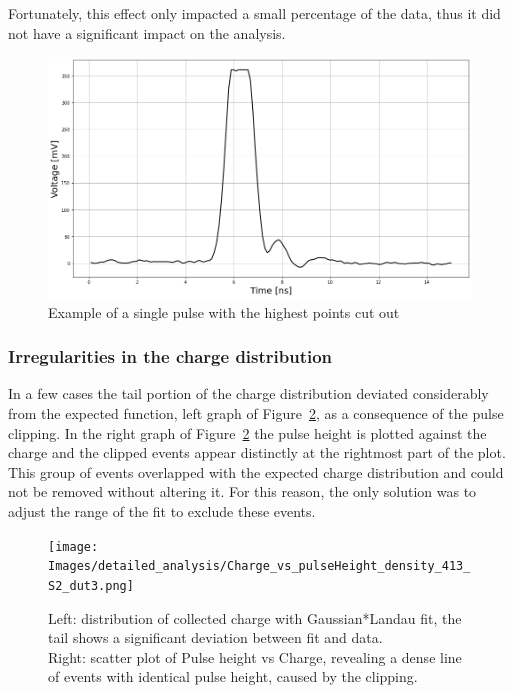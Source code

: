 Fortunately, this effect only impacted a small percentage of the data, thus it did not have a significant impact on the analysis.

\begin{figure}[h!tbp]
    \centering
    \includegraphics[width=.9\linewidth]{Images/detailed_analysis/Waveform of clipped pulse (ns).png}
    \captionsetup{width=\captionwidth}
    \caption{Example of a single pulse with the highest points cut out}
    \label{fig:clipped_pulse}
\end{figure}
 

\subsubsection{Irregularities in the charge distribution}\label{subsec:charge_irregularities}

In a few cases the tail portion of the charge distribution deviated considerably from the expected function, left graph of Figure~\ref{fig:charge_vs_pulseHeight_for_clipping}, as a consequence of the pulse clipping. In the right graph of Figure~\ref{fig:charge_vs_pulseHeight_for_clipping} the pulse height is plotted against the charge and the clipped events appear distinctly at the rightmost part of the plot. This group of events overlapped with the expected charge distribution and could not be removed without altering it. For this reason, the only solution was to adjust the range of the fit to exclude these events.

\begin{figure}[h!tbp]
    \centering
    \texttt{[image: Images/detailed\_analysis/Charge\_vs\_pulseHeight\_density\_413\_S2\_dut3.png]}
    \captionsetup{width=\captionwidth}
    \caption{Left: distribution of collected charge with Gaussian*Landau fit, the tail shows a significant deviation between fit and data. \\
    Right: scatter plot of Pulse height vs Charge, revealing a dense line of events with identical pulse height, caused by the clipping.}
    \label{fig:charge_vs_pulseHeight_for_clipping}
\end{figure}

